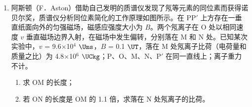 \documentclass[\gkver]{gaokaozhenti}
\begin{document}
\begin{enumerate}
{\begin{enumerate}
	\item
	40

	\item
	充电，B

	\item
	1.8$\times$10$^{-5}$

\end{enumerate}
}

\item
阿斯顿（F．Aston）借助自己发明的质谱仪发现了氖等元素的同位素而获得诺贝尔奖，质谱仪分析同位素简化的工作原理如图所示。在 PP$'$ 上方存在一垂直纸面向外的匀强磁场，磁感应强度大小为 $B$。两个氖离子在 O 处以相同速度 $v$ 垂直磁场边界入射，在磁场中发生偏转，分别落在 M 和 N 处。已知某次实验中，$v$ = 9.6$\times$10$^{4}$ $\Ums$，$B$ = 0.1 $\UT$，落在 M 处氖离子比荷（电荷量和质量之比）为 4.8$\times$10$^{6}$ $\UCkg$；P、O、M、N、P$'$ 在同一直线上；离子重力不计。
\begin{enumerate}
	\item
	求 OM 的长度；
	\item
	若 ON 的长度是 OM 的 1.1 倍，求落在 N 处氖离子的比荷。
\end{enumerate}


\end{enumerate}
\end{document}
